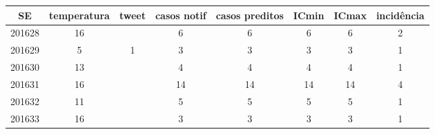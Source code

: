 \begin{tabular}{c|ccccccc}
  \hline
SE & temperatura & tweet & casos notif & casos preditos & ICmin & ICmax & incidência \\ 
  \hline
201628 & 16 &  & 6 & 6 & 6 & 6 & 2 \\ 
  201629 & 5 & 1 & 3 & 3 & 3 & 3 & 1 \\ 
  201630 & 13 &  & 4 & 4 & 4 & 4 & 1 \\ 
  201631 & 16 &  & 14 & 14 & 14 & 14 & 4 \\ 
  201632 & 11 &  & 5 & 5 & 5 & 5 & 1 \\ 
  201633 & 16 &  & 3 & 3 & 3 & 3 & 1 \\ 
   \hline
\end{tabular}
